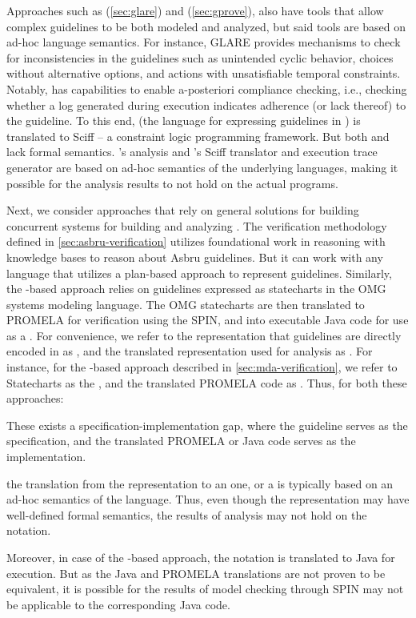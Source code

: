Approaches such as \GLARE{} (\autoref{sec:glare}) and \GPROVE{} (\autoref{sec:gprove}), also have tools that allow complex guidelines to
be both modeled and analyzed, but said tools are based on ad-hoc language
semantics. For instance, GLARE{} provides mechanisms to check
for inconsistencies in the guidelines such as unintended cyclic
behavior, choices without alternative options, and actions
with unsatisfiable temporal constraints. Notably, \GPROVE{}
has capabilities to enable a-posteriori compliance checking, i.e., checking whether a log
generated during execution indicates adherence (or lack thereof) to the guideline.
To this end, \GOSPEL{} (the language for expressing guidelines in \GPROVE{})
is translated to Sciff -- a constraint logic programming framework.
But both \GLARE{} and \GPROVE{} lack formal semantics. \GLARE{}'s analysis
and \GPROVE{}'s Sciff translator and execution trace generator are based on
ad-hoc semantics of the underlying languages, making it possible for the
analysis results to not hold on the actual programs.

Next, we consider approaches that rely on general solutions for building
concurrent systems for building and analyzing \CDSSs{}. The verification methodology
defined in \autoref{sec:asbru-verification} utilizes foundational work in
reasoning with knowledge bases to reason about Asbru guidelines. But it
can work with any language that utilizes a plan-based approach to
represent guidelines. Similarly, the \MDA{}-based approach relies
on guidelines expressed as statecharts in the OMG systems modeling language.
The OMG statecharts are then translated to PROMELA for verification using the SPIN,
and into executable Java code for use as a \CDSS{}.
For convenience, we refer to the representation that guidelines are directly
encoded in as , and the translated representation
used for analysis as .
For instance, for the \MDA{}-based approach described in \autoref{sec:mda-verification}, we refer to Statecharts as the ,
and the translated PROMELA code as .
Thus, for both these approaches:
\begin{enumerate*}[label=(\alph*)]
  \item These exists a specification-implementation gap, where the
     guideline serves as the specification, and the
    translated PROMELA or Java code serves as the implementation.
  \item the translation from the  representation to
    an  one, or a  is typically based on an
    ad-hoc semantics of the  language. Thus, even though
    the  representation may have well-defined formal
    semantics, the results of analysis may not hold on the 
    notation.
\end{enumerate*}
Moreover, in case of the \MDA{}-based approach, the 
notation is translated to Java for execution. But as the Java and
PROMELA translations are not proven to be equivalent, it is possible for
the results of model checking through SPIN may not be applicable to the
corresponding Java code.


